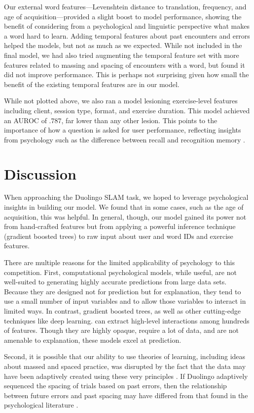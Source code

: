 \documentclass[11pt,a4paper]{article}
\begin{document}
Our external word features---Levenshtein distance to translation, frequency, and
age of acquisition---provided a slight boost to model performance, showing the
benefit of considering from a psychological and linguistic perspective what
makes a word hard to learn. Adding temporal features about past encounters and
errors helped the models, but not as much as we expected. While not included in
the final model, we had also tried augmenting the temporal feature set with more
features related to massing and spacing of encounters with a word, but found it
did not improve performance. This is perhaps not surprising given how small the
benefit of the existing temporal features are in our model.

While not plotted above, we also ran a model lesioning exercise-level features
including client, session type, format, and exercise duration. This model
achieved an AUROC of $.787$, far lower than any other lesion. This points to the
importance of how a question is asked for user performance, reflecting insights
from psychology such as the difference between recall and recognition memory
\cite{yonelinas2002nature}.

\section{Discussion}

When approaching the Duolingo SLAM task, we hoped to leverage psychological
insights in building our model. We found that in some cases, such as the
age of acquisition, this was helpful. In general, though, our model gained its
power not from hand-crafted features but from applying a powerful inference
technique (gradient boosted trees) to raw input about user and word IDs and
exercise features.

There are multiple reasons for the limited applicability of psychology to this
competition. First, computational psychological models, while useful, are not
well-suited to generating highly accurate predictions from large data sets.
Because they are designed not for prediction but for explanation, they tend to
use a small number of input variables and to allow those variables to interact
in limited ways. In contrast, gradient boosted trees, as well as other
cutting-edge techniques like deep learning. can extract high-level
interactions among hundreds of features. Though they are highly opaque, require
a lot of data, and are not amenable to explanation, these models excel at prediction.

Second, it is possible that our ability to use theories of learning, including
ideas about massed and spaced practice, was disrupted by the fact that the data
may have been adaptively created using these very principles
\cite{settles2016trainable}. If Duolingo adaptively sequenced the spacing of
trials based on past errors, then the relationship between future errors and
past spacing may have differed from that found in the psychological literature
\cite{Cepeda:2006aa}.
\end{document}
